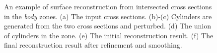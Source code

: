 \begin{figure} [htbp]
{\begin{minipage}[b]{0.22\textwidth}
    \end{minipage}}
  \caption{An example of surface reconstruction from intersected cross sections in the \textit{body} zones.
  (a) The input cross sections.
  (b)-(c) Cylinders are generated from the two cross sections and perturbed.
  (d) The union of cylinders in the zone.
  (e) The initial reconstruction result.
  (f) The final reconstruction result after refinement and smoothing.}
  \label{fig:csinters} %
\end{figure}

